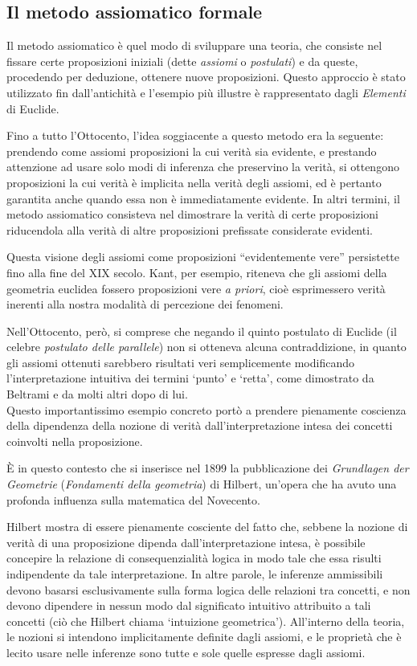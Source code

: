 \subsection{Il metodo assiomatico formale}

Il metodo assiomatico è quel modo di sviluppare una teoria, che consiste nel fissare certe proposizioni iniziali (dette \emph{assiomi} o \emph{postulati}) e da queste, procedendo per deduzione, ottenere nuove proposizioni. Questo approccio è stato utilizzato fin dall'antichità e l'esempio più illustre è rappresentato dagli \emph{Elementi} di Euclide.

Fino a tutto l'Ottocento, l'idea soggiacente a questo metodo era la seguente: prendendo come assiomi proposizioni la cui verità sia evidente, e prestando attenzione ad usare solo modi di inferenza che preservino la verità, si ottengono proposizioni la cui verità è implicita nella verità degli assiomi, ed è pertanto garantita anche quando essa non è immediatamente evidente. In altri termini, il metodo assiomatico consisteva nel dimostrare la verità di certe proposizioni riducendola alla verità di altre proposizioni prefissate considerate evidenti.

Questa visione degli assiomi come proposizioni ``evidentemente vere'' per\-si\-stet\-te fino alla fine del XIX secolo. Kant, per esempio, riteneva che gli assiomi della geo\-me\-tria euclidea fossero proposizioni vere \emph{a priori}, cioè esprimessero verità inerenti alla nostra modalità di percezione dei fenomeni.

Nell'Ottocento, però, si comprese che negando il quinto postulato di Euclide (il celebre \emph{postulato delle parallele}) non si otteneva alcuna contraddizione, in quanto gli assiomi ottenuti sarebbero risultati veri semplicemente modificando l'interpretazione intuitiva dei termini `punto' e `retta', come dimostrato da Beltrami e da molti altri dopo di lui.\\
Questo importantissimo esempio concreto portò a prendere pienamente coscienza della dipendenza della nozione di verità dall'interpretazione intesa dei concetti coinvolti nella proposizione.

\`{E} in questo contesto che si inserisce nel 1899 la pubblicazione dei \emph{Grundlagen der Geometrie} (\emph{Fondamenti della geometria}) di Hilbert, un'opera che ha avuto una profonda influenza sulla matematica del Novecento.

Hilbert mostra di essere pienamente cosciente del fatto che, sebbene la nozione di verità di una proposizione dipenda dall'interpretazione intesa, è possibile concepire la relazione di consequenzialità logica in modo tale che essa risulti indipendente da tale interpretazione. In altre parole, le inferenze ammissibili devono basarsi esclusivamente sulla forma logica delle relazioni tra concetti, e non devono dipendere in nessun modo dal significato intuitivo attribuito a tali concetti (ciò che Hilbert chiama `intuizione geometrica'). All'interno della teoria, le nozioni si intendono implicitamente definite dagli assiomi, e le proprietà che è lecito usare nelle inferenze sono tutte e sole quelle espresse dagli assiomi.

